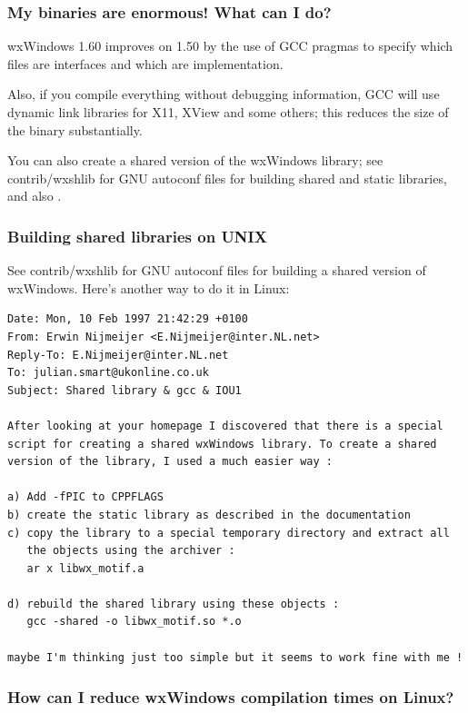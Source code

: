 \subsubsection{My binaries are enormous! What can I do?}

wxWindows 1.60 improves on 1.50 by the use of GCC pragmas to
specify which files are interfaces and which are implementation.

Also, if you compile everything without debugging information,
GCC will use dynamic link libraries for X11, XView and some others;
this reduces the size of the binary substantially.

You can also create a shared version of the wxWindows library; see
contrib/wxshlib for GNU autoconf files for building shared and
static libraries, and also .

\subsubsection{Building shared libraries on UNIX}\label{shared}

See contrib/wxshlib for GNU autoconf files for building a shared version
of wxWindows. Here's another way to do it in Linux:

{\small
\begin{verbatim}
Date: Mon, 10 Feb 1997 21:42:29 +0100
From: Erwin Nijmeijer <E.Nijmeijer@inter.NL.net>
Reply-To: E.Nijmeijer@inter.NL.net
To: julian.smart@ukonline.co.uk
Subject: Shared library & gcc & IOU1

After looking at your homepage I discovered that there is a special
script for creating a shared wxWindows library. To create a shared
version of the library, I used a much easier way :

a) Add -fPIC to CPPFLAGS
b) create the static library as described in the documentation
c) copy the library to a special temporary directory and extract all
   the objects using the archiver :
   ar x libwx_motif.a

d) rebuild the shared library using these objects :
   gcc -shared -o libwx_motif.so *.o

maybe I'm thinking just too simple but it seems to work fine with me !
\end{verbatim}
}

\subsubsection{How can I reduce wxWindows compilation times on Linux?}

